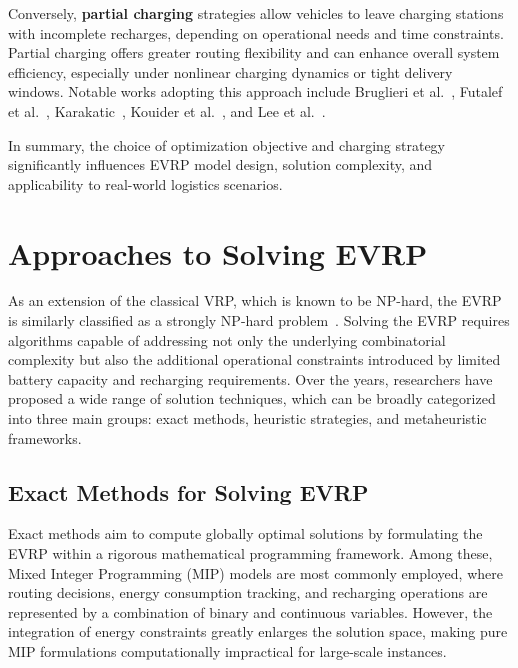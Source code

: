Conversely, \textbf{partial charging} strategies allow vehicles to leave charging stations with incomplete recharges, depending on operational needs and time constraints.  
Partial charging offers greater routing flexibility and can enhance overall system efficiency, especially under nonlinear charging dynamics or tight delivery windows.  
Notable works adopting this approach include Bruglieri et al.~\cite{bruglieri2017three}, Futalef et al.~\cite{futalef2020evolutionary}, Karakatic~\cite{karakativc2021optimizing}, Kouider et al.~\cite{kouider2018constructive}, and Lee et al.~\cite{lee2021exact}.

In summary, the choice of optimization objective and charging strategy significantly influences EVRP model design, solution complexity, and applicability to real-world logistics scenarios.


\section{Approaches to Solving EVRP}

As an extension of the classical VRP, which is known to be NP-hard, the EVRP is similarly classified as a strongly NP-hard problem~\cite{desaulniers2016exact,ferro2018optimization,roberti2016electric}.  
Solving the EVRP requires algorithms capable of addressing not only the underlying combinatorial complexity but also the additional operational constraints introduced by limited battery capacity and recharging requirements.  
Over the years, researchers have proposed a wide range of solution techniques, which can be broadly categorized into three main groups: exact methods, heuristic strategies, and metaheuristic frameworks.

\subsection{Exact Methods for Solving EVRP}

Exact methods aim to compute globally optimal solutions by formulating the EVRP within a rigorous mathematical programming framework.  
Among these, Mixed Integer Programming (MIP) models are most commonly employed, where routing decisions, energy consumption tracking, and recharging operations are represented by a combination of binary and continuous variables.  
However, the integration of energy constraints greatly enlarges the solution space, making pure MIP formulations computationally impractical for large-scale instances.

